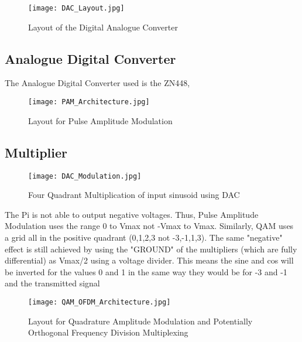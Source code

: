 \documentclass[../main.tex]{subfiles}
\begin{document}
\begin{figure}[ht]
	\centering
	\texttt{[image: DAC\_Layout.jpg]}
	\caption{Layout of the Digital Analogue Converter}
	\label{fig_DAC Layout}
\end{figure}

\subsection{Analogue Digital Converter}

The Analogue Digital Converter used is the ZN448, 


\begin{figure}[ht]
	\centering
	\texttt{[image: PAM\_Architecture.jpg]}
	\caption{Layout for Pulse Amplitude Modulation}
\end{figure}

\subsection{Multiplier} \label{sec_Multiplier}


\begin{figure}[ht]
	\centering
	\texttt{[image: DAC\_Modulation.jpg]}
	\caption{Four Quadrant Multiplication of input sinusoid using DAC}
\end{figure}

The Pi is not able to output negative voltages. Thus, Pulse Amplitude Modulation
uses the range 0 to Vmax not -Vmax to Vmax. Similarly, QAM uses a grid all in
the positive quadrant (0,1,2,3 not -3,-1,1,3). The same "negative" effect is still
achieved by using the "GROUND" of the multipliers (which are fully differential)
as Vmax/2 using a voltage divider. This means the sine and cos will be inverted
for the values 0 and 1 in the same way they would be for -3 and -1 and the
transmitted signal

\begin{figure}[ht]
	\centering
	\texttt{[image: QAM\_OFDM\_Architecture.jpg]}
	\caption{Layout for Quadrature Amplitude Modulation and Potentially Orthogonal Frequency Division Multiplexing}
\end{figure}
\end{document}
